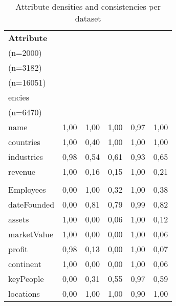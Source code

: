 \begin{table}[H]
\centering
\begin{tabularx}{\linewidth}{|X|c|c|c|c|c|}
\hline
\textbf{Attribute} & \textbf{\begin{tabular}[c]{@{}c@{}}Forbes\\ (n=2000)\end{tabular}} & \textbf{\begin{tabular}[c]{@{}c@{}}Freebase\\ (n=3182)\end{tabular}} & \textbf{\begin{tabular}[c]{@{}c@{}}DBpedia\\ (n=16051)\end{tabular}} & \textbf{\begin{tabular}[c]{@{}c@{}}Consist-\\ encies\end{tabular}} & \textbf{\begin{tabular}[c]{@{}c@{}}Fused\\ (n=6470)\end{tabular}} \\ \hline
name & 1,00 & 1,00 & 1,00 & 0,97 & 1,00 \\ \hline
countries & 1,00 & 0,40 & 1,00 & 1,00 & 1,00 \\ \hline
industries & 0,98 & 0,54 & 0,61 & 0,93 & 0,65 \\ \hline
revenue & 1,00 & 0,16 & 0,15 & 1,00 & 0,21 \\ \hline
\begin{tabular}[c]{@{}l@{}}numberOf-\\ Employees\end{tabular} & 0,00 & 1,00 & 0,32 & 1,00 & 0,38 \\ \hline
dateFounded & 0,00 & 0,81 & 0,79 & 0,99 & 0,82 \\ \hline
assets & 1,00 & 0,00 & 0,06 & 1,00 & 0,12 \\ \hline
marketValue & 1,00 & 0,00 & 0,00 & 1,00 & 0,06 \\ \hline
profit & 0,98 & 0,13 & 0,00 & 1,00 & 0,07 \\ \hline
continent & 1,00 & 0,00 & 0,00 & 1,00 & 0,06 \\ \hline
keyPeople & 0,00 & 0,31 & 0,55 & 0,97 & 0,59 \\ \hline
locations & 0,00 & 1,00 & 1,00 & 0,90 & 1,00 \\ \hline
\end{tabularx}
\caption{Attribute densities and consistencies per dataset}
\label{tableAttributeDensities}
\end{table}


